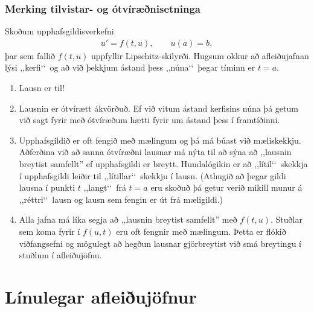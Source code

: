 \documentclass[a4paper,10pt,icelandic]{sphinxmanual}
\begin{document}
\subsection{Merking tilvistar- og ótvíræðnisetninga}
\label{\detokenize{Kafli06:merking-tilvistar-og-otviraenisetninga}}
Skoðum upphafsgildisverkefni
\begin{equation*}
\begin{split}u'=f(t,u),\qquad u(a)=b,\end{split}
\end{equation*}
þar sem fallið \(f(t,u)\) uppfyllir Lipschitz-skilyrði.  Hugsum okkur að afleiðujafnan lýsi ,,kerfi‘‘ og að við þekkjum ástand þess ,,núna‘‘ þegar tíminn er \(t=a\).
\begin{enumerate}
%
\item {} 
Lausn er til!

\item {} 
Lausnin er ótvírætt ákvörðuð. Ef við vitum ástand kerfisins núna þá getum við sagt fyrir með ótvíræðum hætti fyrir um ástand þess í framtíðinni.

\item {} 
Upphafsgildið er oft fengið með mælingum og þá má búast við mæliskekkju. Aðferðina við að sanna ótvíræðni lausnar má nýta til að sýna að ,,lausnin breytist samfellt” ef upphafsgildi er breytt. Hundalógikin er að ,,lítil‘‘ skekkja í upphafsgildi leiðir til ,,lítillar‘‘ skekkju í lausn. (Athugið að þegar gildi lausna í punkti \(t\) ,,langt‘‘ frá \(t=a\) eru skoðuð þá getur verið mikill munur á ,,réttri‘‘ lausn og lausn sem fengin er út frá mæligildi.)

\item {} 
Alla jafna má líka segja að ,,lausnin breytist samfellt” með \(f(t,u)\). Stuðlar sem koma fyrir í \(f(u,t)\) eru oft fengnir með mælingum. Þetta er flókið viðfangsefni og mögulegt að hegðun lausnar gjörbreytist við smá breytingu í stuðlum í afleiðujöfnu.

\end{enumerate}


\chapter{Línulegar afleiðujöfnur}
\label{\detokenize{Kafli07:linulegar-afleiujofnur}}\label{\detokenize{Kafli07::doc}}
\end{document}
